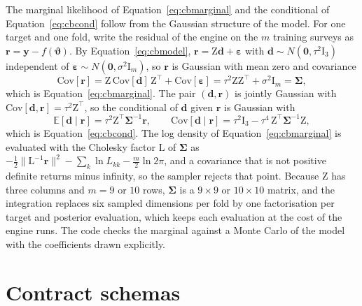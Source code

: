 The marginal likelihood of Equation~\eqref{eq:cbmarginal} and the conditional of Equation~\eqref{eq:cbcond} follow from the Gaussian structure of the
model. For one target and one fold, write the residual of the engine on the $m$ training surveys as $\mathbf r=\mathbf y-f(\boldsymbol\vartheta)$. By
Equation~\eqref{eq:cbmodel}, $\mathbf r=\mathrm Z\mathbf d+\boldsymbol\varepsilon$ with $\mathbf d\sim N(\mathbf 0,\tau^2\mathrm I_3)$ independent of
$\boldsymbol\varepsilon\sim N(\mathbf 0,\sigma^2\mathrm I_m)$, so $\mathbf r$ is Gaussian with mean zero and covariance
\begin{equation}
\mathrm{Cov}[\mathbf r] = \mathrm Z\,\mathrm{Cov}[\mathbf d]\,\mathrm Z^{\top} + \mathrm{Cov}[\boldsymbol\varepsilon] = \tau^2\mathrm Z\mathrm Z^{\top} + \sigma^2\mathrm I_m = \boldsymbol\Sigma ,
\label{eq:app-cov}
\end{equation}
which is Equation~\eqref{eq:cbmarginal}. The pair $(\mathbf d,\mathbf r)$ is jointly Gaussian with $\mathrm{Cov}[\mathbf d,\mathbf r]=\tau^2\mathrm Z^{\top}$,
so the conditional of $\mathbf d$ given $\mathbf r$ is Gaussian with
\begin{equation}
\mathbb E[\mathbf d\mid\mathbf r] = \tau^2\mathrm Z^{\top}\boldsymbol\Sigma^{-1}\mathbf r,\qquad
\mathrm{Cov}[\mathbf d\mid\mathbf r] = \tau^2\mathrm I_3 - \tau^4\,\mathrm Z^{\top}\boldsymbol\Sigma^{-1}\mathrm Z ,
\label{eq:app-cond}
\end{equation}
which is Equation~\eqref{eq:cbcond}. The log density of Equation~\eqref{eq:cbmarginal} is evaluated with the Cholesky factor $\mathrm L$ of
$\boldsymbol\Sigma$ as $-\tfrac12\|\mathrm L^{-1}\mathbf r\|^2-\sum_k\ln L_{kk}-\tfrac m2\ln2\pi$, and a covariance that is not positive definite returns
minus infinity, so the sampler rejects that point. Because $\mathrm Z$ has three columns and $m=9$ or $10$ rows, $\boldsymbol\Sigma$ is a $9\times9$ or
$10\times10$ matrix, and the integration replaces six sampled dimensions per fold by one factorisation per target and posterior evaluation, which keeps each evaluation at the cost of the engine runs. The code checks
the marginal against a Monte Carlo of the model with the coefficients drawn explicitly.

\section{Contract schemas}\label{app:schemas}


